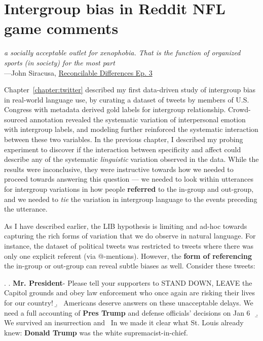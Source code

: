 \chapter{Intergroup bias in Reddit NFL game comments}
\label{chapter:football}

\begin{center}
    \textit{\textellipsis a socially acceptable outlet for xenophobia. That is the function of organized sports (in society) for the most part\textellipsis}
    \\\hspace{4em}---John Siracusa, \href{https://www.relay.fm/rd/3}{Reconcilable Differences Ep. 3}
\end{center}

Chapter~\ref{chapter:twitter} described my first data-driven study of intergroup bias in real-world language use, by curating a dataset of tweets by members of U.S. Congress with metadata derived gold labels for intergroup relationship. Crowd-sourced annotation revealed the systematic variation of interpersonal emotion with intergroup labels, and modeling further reinforced the systematic interaction between these two variables. In the previous chapter, I described my probing experiment to discover if the interaction between specificity and affect could describe any of the systematic \emph{linguistic} variation observed in the data. While the results were inconclusive, they were instructive towards how we needed to proceed towards answering this question --- we needed to look within utterances for intergroup variations in how people \textbf{referred} to the in-group and out-group, and we needed to \emph{tie} the variation in intergroup language to the events preceding the utterance.

As I have described earlier, the LIB hypothesis is limiting and ad-hoc towards capturing the rich forms of variation that we do observe in natural language. For instance, the dataset of political tweets was restricted to tweets where there was only one explicit referent (via @-mentions). However, the \textbf{form of referencing} the in-group or out-group can reveal subtle biases as well. Consider these tweets:

\ex. \label{ex:trump-tweets} \a.\label{ex:trump-tweet-1} \textbf{Mr. President}- Please tell your supporters to STAND DOWN, LEAVE the Capitol grounds and obey law enforcement who once again are risking their lives for our country!\textellipsis
    \b. \label{ex:trump-tweet-2} \textellipsis~Americans deserve answers on these unacceptable delays. We need a full accounting of \textbf{Pres Trump} and defense officials’ decisions on Jan 6~\textellipsis
    \b. \label{ex:trump-tweet-3} We survived an insurrection and \textellipsis~In we made it clear what St. Louis already knew: \textbf{Donald Trump} was the white supremacist-in-chief.


